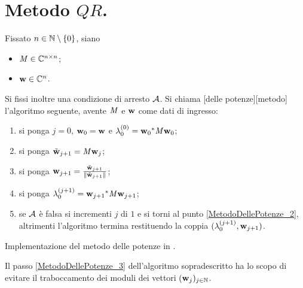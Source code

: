 \section{Metodo $QR$.}
\label{CalcoloScientifico_MetodoQR}
\begin{Definition}
  Fissato $n \in \mathbb{N} \setminus \lbrace 0 \rbrace$, siano
  \begin{itemize}
    \item $\mathit{M} \in \mathbb{C}^{n \times n}$;
    \item $\mathbf{w} \in \mathbb{C}^n$.
  \end{itemize}
  Si fissi inoltre una condizione di arresto $\mathcal{A}$.
  Si chiama
  [delle potenze][metodo]
  l'algoritmo seguente, avente $\mathit{M}$ e $\mathbf{w}$
  come dati di ingresso:
  \begin{enumerate}
    \item\label{MetodoDellePotenze_1} si ponga $j = 0$,
      $\mathbf{w}_0 = \mathbf{w}$ e
      $\lambda_0^{(0)} =
        {\mathbf{w}_0}^*\mathit{M}\mathbf{w}_{0}$;
    \item\label{MetodoDellePotenze_2} si ponga
      $\tilde{\mathbf{w}}_{j + 1} = \mathit{M} \mathbf{w}_j$;
    \item\label{MetodoDellePotenze_3} si ponga
      $\VarVector_{j + 1}
      = \frac{\tilde{\VarVector}_{j + 1}}{\Norm{\tilde{\VarVector}_{j + 1}}}$;
    \item\label{MetodoDellePotenze_4} si ponga $\lambda_0^{(j + 1)}
      = {\mathbf{w}_{j + 1}}^*\mathit{M}\mathbf{w}_{j + 1}$;
    \item\label{MetodoDellePotenze_5} se
      $\mathcal{A}$ \`e falsa
      si incrementi $j$ di $1$ e si torni al punto
      \ref{MetodoDellePotenze_2}, altrimenti l'algoritmo termina
      restituendo la coppia $(\lambda_0^{(j + 1)},\mathbf{w}_{j + 1})$.
  \end{enumerate}
\end{Definition}
\begin{listing}
	\caption{Implementazione del metodo delle potenze in .}
\end{listing}
\par Il passo \ref{MetodoDellePotenze_3} dell'algoritmo sopradescritto ha
lo scopo di evitare il traboccamento dei moduli dei vettori
$(\mathbf{w}_j)_{j \in \mathbb{N}}$.
